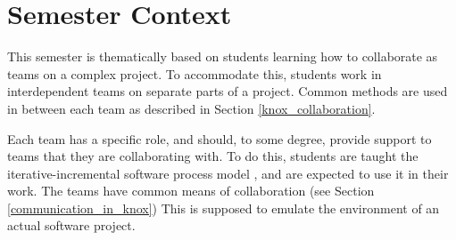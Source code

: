 \section{Semester Context}
This semester is thematically based on students learning how to collaborate as teams on a complex project. 
To accommodate this, students work in interdependent teams on separate parts of a project. 
Common methods are used in between each team as described in Section \ref{knox_collaboration}. 

Each team has a specific role, and should, to some degree, provide support to teams that they are collaborating with.
To do this, students are taught the iterative-incremental software process model \cite{SoftwareProcessModels}, and are expected to use it in their work. The teams have common means of collaboration (see Section \ref{communication_in_knox})
This is supposed to emulate the environment of an actual software project. 


% 



% 
